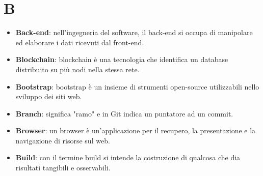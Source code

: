 \documentclass[a4paper, oneside, openany, dvipsnames, table]{article}
\begin{document}
\section{B}
\begin{itemize}
\item \textbf{Back-end}: nell'ingegneria del software, il back-end si occupa di manipolare ed elaborare i dati ricevuti dal front-end.	
\item \textbf{Blockchain}: blockchain è una tecnologia che identifica un database distribuito su più nodi nella stessa rete.
\item \textbf{Bootstrap}: bootstrap è un insieme di strumenti open-source utilizzabili nello sviluppo dei siti web.
\item \textbf{Branch}: significa "ramo" e in Git indica un puntatore ad un commit.
\item \textbf{Browser}: un browser è un'applicazione per il recupero, la presentazione e la navigazione di risorse sul web.
\item \textbf{Build}: con il termine build si intende la costruzione di qualcosa che dia risultati tangibili e osservabili.
\end{itemize}
\end{document}
